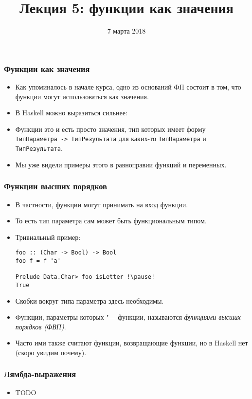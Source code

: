\documentclass[10pt]{beamer}
\title{Лекция 5: функции как значения}
\date{7 марта 2018}
\begin{document}
\begin{frame}[plain]
\maketitle
\end{frame}

\begin{frame}[fragile]
\frametitle{Функции как значения}
\begin{itemize}
    \item Как упоминалось в начале курса, одно из оснований ФП состоит в том, что функции могут использоваться как значения.
    \item В Haskell можно выразиться сильнее:\pause
    \item Функции это и есть просто значения, тип которых имеет форму \lstinline|ТипПараметра -> ТипРезультата| для каких-то \lstinline|ТипПараметра| и \lstinline|ТипРезультата|.\pause
    \item Мы уже видели примеры этого в равноправии функций и переменных.
\end{itemize}
\end{frame}

\begin{frame}[fragile]
\frametitle{Функции высших порядков}
\begin{itemize}
    \item В частности, функции могут принимать на вход функции.
    \item То есть тип параметра сам может быть функциональным типом. 
    \item Тривиальный пример:
\begin{lstlisting}
foo :: (Char -> Bool) -> Bool
foo f = f 'a'

Prelude Data.Char> foo isLetter !\pause!
True
\end{lstlisting} 
    \item Скобки вокруг типа параметра здесь необходимы.\pause
    \item Функции, параметры которых "--- функции, называются \emph{функциями высших порядков (ФВП)}.\pause
    \item Часто ими также считают функции, возвращающие функции, но в Haskell нет (скоро увидим почему).
\end{itemize}
\end{frame}

\begin{frame}[fragile]
\frametitle{Лямбда-выражения}
\begin{itemize}
    \item TODO
\end{itemize}
\end{frame}
\end{document}
